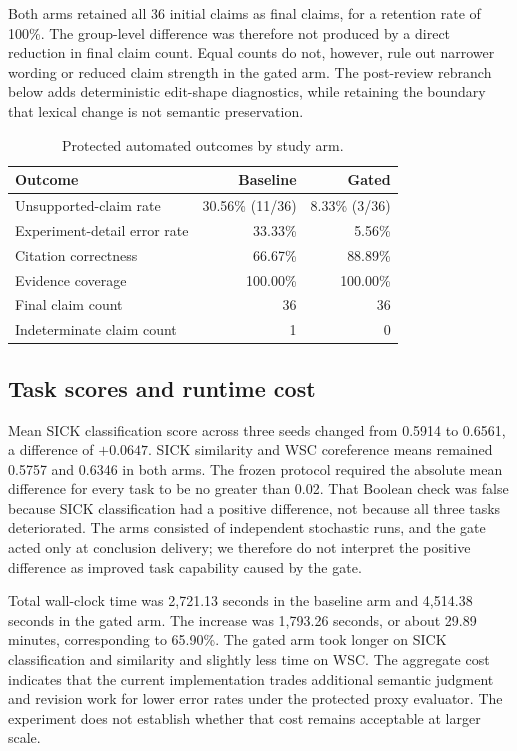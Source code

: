 \documentclass[11pt]{article}
\begin{document}
Both arms retained all 36 initial claims as final claims, for a retention rate of 100\%. The group-level difference was therefore not produced by a direct reduction in final claim count. Equal counts do not, however, rule out narrower wording or reduced claim strength in the gated arm. The post-review rebranch below adds deterministic edit-shape diagnostics, while retaining the boundary that lexical change is not semantic preservation.

\begin{table}[H]
\centering
\caption{Protected automated outcomes by study arm.}
\label{tab:protected}
\begin{tabularx}{0.88\textwidth}{>{\raggedright\arraybackslash}X r r}
\toprule
Outcome & Baseline & Gated \\
\midrule
Unsupported-claim rate & 30.56\% (11/36) & 8.33\% (3/36) \\
Experiment-detail error rate & 33.33\% & 5.56\% \\
Citation correctness & 66.67\% & 88.89\% \\
Evidence coverage & 100.00\% & 100.00\% \\
Final claim count & 36 & 36 \\
Indeterminate claim count & 1 & 0 \\
\bottomrule
\end{tabularx}
\end{table}

\subsection{Task scores and runtime cost}

Mean SICK classification score across three seeds changed from 0.5914 to 0.6561, a difference of $+0.0647$. SICK similarity and WSC coreference means remained 0.5757 and 0.6346 in both arms. The frozen protocol required the absolute mean difference for every task to be no greater than 0.02. That Boolean check was false because SICK classification had a positive difference, not because all three tasks deteriorated. The arms consisted of independent stochastic runs, and the gate acted only at conclusion delivery; we therefore do not interpret the positive difference as improved task capability caused by the gate.

Total wall-clock time was 2,721.13 seconds in the baseline arm and 4,514.38 seconds in the gated arm. The increase was 1,793.26 seconds, or about 29.89 minutes, corresponding to 65.90\%. The gated arm took longer on SICK classification and similarity and slightly less time on WSC. The aggregate cost indicates that the current implementation trades additional semantic judgment and revision work for lower error rates under the protected proxy evaluator. The experiment does not establish whether that cost remains acceptable at larger scale.
\end{document}
